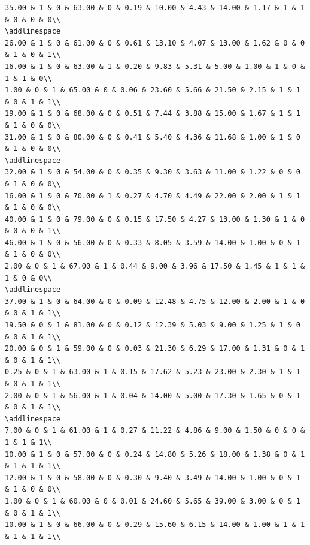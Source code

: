 \documentclass[
]{article}
\begin{document}
\begin{verbatim}
35.00 & 1 & 0 & 63.00 & 0 & 0.19 & 10.00 & 4.43 & 14.00 & 1.17 & 1 & 1 & 0 & 0 & 0\\
\addlinespace
26.00 & 1 & 0 & 61.00 & 0 & 0.61 & 13.10 & 4.07 & 13.00 & 1.62 & 0 & 0 & 1 & 0 & 1\\
16.00 & 1 & 0 & 63.00 & 1 & 0.20 & 9.83 & 5.31 & 5.00 & 1.00 & 1 & 0 & 1 & 1 & 0\\
1.00 & 0 & 1 & 65.00 & 0 & 0.06 & 23.60 & 5.66 & 21.50 & 2.15 & 1 & 1 & 0 & 1 & 1\\
19.00 & 1 & 0 & 68.00 & 0 & 0.51 & 7.44 & 3.88 & 15.00 & 1.67 & 1 & 1 & 1 & 0 & 0\\
31.00 & 1 & 0 & 80.00 & 0 & 0.41 & 5.40 & 4.36 & 11.68 & 1.00 & 1 & 0 & 1 & 0 & 0\\
\addlinespace
32.00 & 1 & 0 & 54.00 & 0 & 0.35 & 9.30 & 3.63 & 11.00 & 1.22 & 0 & 0 & 1 & 0 & 0\\
16.00 & 1 & 0 & 70.00 & 1 & 0.27 & 4.70 & 4.49 & 22.00 & 2.00 & 1 & 1 & 1 & 0 & 0\\
40.00 & 1 & 0 & 79.00 & 0 & 0.15 & 17.50 & 4.27 & 13.00 & 1.30 & 1 & 0 & 0 & 0 & 1\\
46.00 & 1 & 0 & 56.00 & 0 & 0.33 & 8.05 & 3.59 & 14.00 & 1.00 & 0 & 1 & 1 & 0 & 0\\
2.00 & 0 & 1 & 67.00 & 1 & 0.44 & 9.00 & 3.96 & 17.50 & 1.45 & 1 & 1 & 1 & 0 & 0\\
\addlinespace
37.00 & 1 & 0 & 64.00 & 0 & 0.09 & 12.48 & 4.75 & 12.00 & 2.00 & 1 & 0 & 0 & 1 & 1\\
19.50 & 0 & 1 & 81.00 & 0 & 0.12 & 12.39 & 5.03 & 9.00 & 1.25 & 1 & 0 & 0 & 1 & 1\\
20.00 & 0 & 1 & 59.00 & 0 & 0.03 & 21.30 & 6.29 & 17.00 & 1.31 & 0 & 1 & 0 & 1 & 1\\
0.25 & 0 & 1 & 63.00 & 1 & 0.15 & 17.62 & 5.23 & 23.00 & 2.30 & 1 & 1 & 0 & 1 & 1\\
2.00 & 0 & 1 & 56.00 & 1 & 0.04 & 14.00 & 5.00 & 17.30 & 1.65 & 0 & 1 & 0 & 1 & 1\\
\addlinespace
7.00 & 0 & 1 & 61.00 & 1 & 0.27 & 11.22 & 4.86 & 9.00 & 1.50 & 0 & 0 & 1 & 1 & 1\\
10.00 & 1 & 0 & 57.00 & 0 & 0.24 & 14.80 & 5.26 & 18.00 & 1.38 & 0 & 1 & 1 & 1 & 1\\
12.00 & 1 & 0 & 58.00 & 0 & 0.30 & 9.40 & 3.49 & 14.00 & 1.00 & 0 & 1 & 1 & 0 & 0\\
1.00 & 0 & 1 & 60.00 & 0 & 0.01 & 24.60 & 5.65 & 39.00 & 3.00 & 0 & 1 & 0 & 1 & 1\\
10.00 & 1 & 0 & 66.00 & 0 & 0.29 & 15.60 & 6.15 & 14.00 & 1.00 & 1 & 1 & 1 & 1 & 1\\

\end{verbatim}
\end{document}
